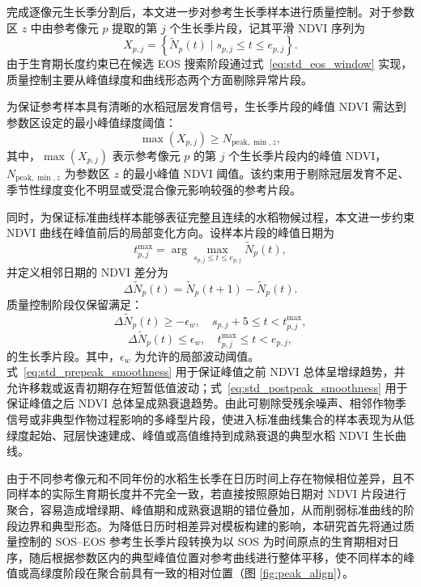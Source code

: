 完成逐像元生长季分割后，本文进一步对参考生长季样本进行质量控制。对于参数区 \(z\) 中由参考像元 \(p\) 提取的第 \(j\) 个生长季片段，记其平滑 NDVI 序列为
\[
    X_{p,j}=\left\{\widetilde{N}_p(t)\mid s_{p,j}\leq t\leq e_{p,j}\right\}.
\]
由于生育期长度约束已在候选 EOS 搜索阶段通过式~\ref{eq:std_eos_window} 实现，质量控制主要从峰值绿度和曲线形态两个方面剔除异常片段。

为保证参考样本具有清晰的水稻冠层发育信号，生长季片段的峰值 NDVI 需达到参数区设定的最小峰值绿度阈值：
\begin{equation}
    \max\left(X_{p,j}\right)\geq N_{\mathrm{peak},\min,z},
    \label{eq:std_peak_threshold}
\end{equation}
其中，\(\max\left(X_{p,j}\right)\) 表示参考像元 \(p\) 的第 \(j\) 个生长季片段内的峰值 NDVI，\(N_{\mathrm{peak},\min,z}\) 为参数区 \(z\) 的最小峰值 NDVI 阈值。该约束用于剔除冠层发育不足、季节性绿度变化不明显或受混合像元影响较强的参考片段。

同时，为保证标准曲线样本能够表征完整且连续的水稻物候过程，本文进一步约束 NDVI 曲线在峰值前后的局部变化方向。设样本片段的峰值日期为
\begin{equation}
    t^{\max}_{p,j}
    =
    \arg\max_{s_{p,j}\leq t\leq e_{p,j}}
    \widetilde{N}_p(t),
    \label{eq:std_peak_date}
\end{equation}
并定义相邻日期的 NDVI 差分为
\begin{equation}
    \Delta\widetilde{N}_p(t)
    =
    \widetilde{N}_p(t+1)-\widetilde{N}_p(t).
    \label{eq:std_ref_derivative}
\end{equation}
质量控制阶段仅保留满足：
\begin{equation}
    \Delta\widetilde{N}_p(t)\geq -\epsilon_w,
    \quad s_{p,j}+5\leq t<t^{\max}_{p,j},
    \label{eq:std_prepeak_smoothness}
\end{equation}
\begin{equation}
    \Delta\widetilde{N}_p(t)\leq \epsilon_w,
    \quad t^{\max}_{p,j}\leq t<e_{p,j},
    \label{eq:std_postpeak_smoothness}
\end{equation}
的生长季片段。其中，\(\epsilon_w\) 为允许的局部波动阈值。式~\ref{eq:std_prepeak_smoothness} 用于保证峰值之前 NDVI 总体呈增绿趋势，并允许移栽或返青初期存在短暂低值波动；式~\ref{eq:std_postpeak_smoothness} 用于保证峰值之后 NDVI 总体呈成熟衰退趋势。由此可剔除受残余噪声、相邻作物季信号或非典型作物过程影响的多峰型片段，使进入标准曲线集合的样本表现为从低绿度起始、冠层快速建成、峰值或高值维持到成熟衰退的典型水稻 NDVI 生长曲线。

由于不同参考像元和不同年份的水稻生长季在日历时间上存在物候相位差异，且不同样本的实际生育期长度并不完全一致，若直接按照原始日期对 NDVI 片段进行聚合，容易造成增绿期、峰值期和成熟衰退期的错位叠加，从而削弱标准曲线的阶段边界和典型形态。为降低日历时相差异对模板构建的影响，本研究首先将通过质量控制的 SOS--EOS 参考生长季片段转换为以 SOS 为时间原点的生育期相对日序，随后根据参数区内的典型峰值位置对参考曲线进行整体平移，使不同样本的峰值或高绿度阶段在聚合前具有一致的相对位置（图 \ref{fig:peak_align}）。


